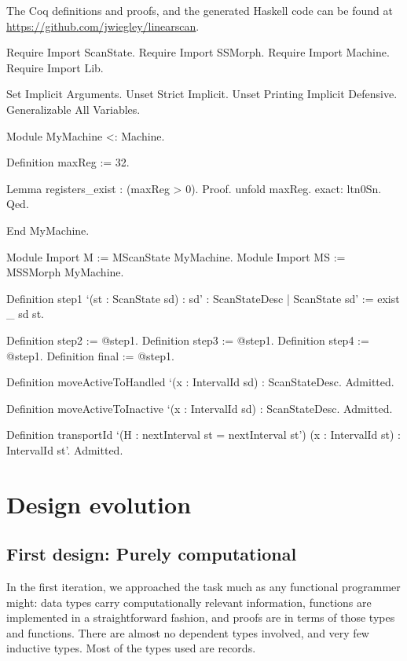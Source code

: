 \documentclass{llncs}
\begin{document}
The Coq definitions and proofs, and the generated Haskell code can be found at
\url{https://github.com/jwiegley/linearscan}.


\begin{MyCoqEval}
Require Import ScanState.
Require Import SSMorph.
Require Import Machine.
Require Import Lib.

Set Implicit Arguments.
Unset Strict Implicit.
Unset Printing Implicit Defensive.
Generalizable All Variables.

Module MyMachine <: Machine.

Definition maxReg := 32.

Lemma registers_exist : (maxReg > 0).
Proof. unfold maxReg. exact: ltn0Sn. Qed.

End MyMachine.

Module Import M := MScanState MyMachine.
Module Import MS := MSSMorph MyMachine.

Definition step1 `(st : ScanState sd)
  : { sd' : ScanStateDesc | ScanState sd' } :=
  exist _ sd st.

Definition step2 := @step1.
Definition step3 := @step1.
Definition step4 := @step1.
Definition final := @step1.

Definition moveActiveToHandled `(x : IntervalId sd) : ScanStateDesc.
Admitted.

Definition moveActiveToInactive `(x : IntervalId sd) : ScanStateDesc.
Admitted.

Definition transportId `(H : nextInterval st = nextInterval st')
  (x : IntervalId st) : IntervalId st'.
Admitted.
\end{MyCoqEval}

\section{Design evolution}
\label{sec:evolve}

\subsection{First design: Purely computational}
\label{sec:compdesign}

In the first iteration, we approached the task much as any functional
programmer might: data types carry computationally relevant information,
functions are implemented in a straightforward fashion, and proofs are in
terms of those types and functions.  There are almost no dependent types
involved, and very few inductive types.  Most of the types used are records.
\end{document}
